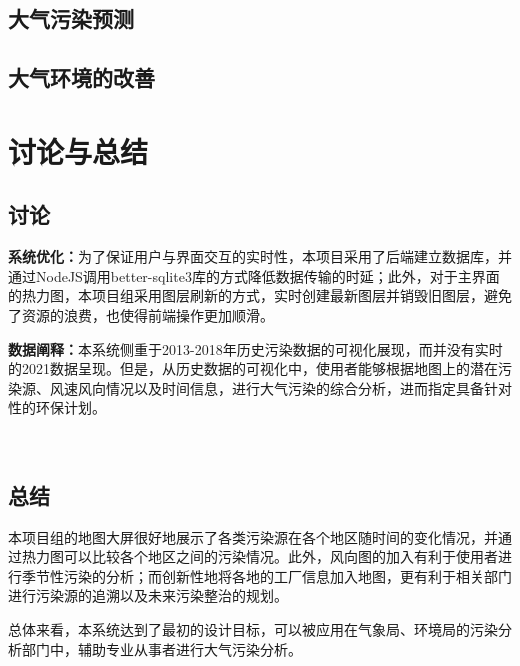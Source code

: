 \documentclass[UTF8]{ctexrep}
\begin{document}
    \subsection{大气污染预测}

    \subsection{大气环境的改善}

    \section{讨论与总结}
    \subsection{讨论}
    \textbf{系统优化：}为了保证用户与界面交互的实时性，本项目采用了后端建立数据库，并通过NodeJS调用better-sqlite3库的方式降低数据传输的时延；此外，对于主界面的热力图，本项目组采用图层刷新的方式，实时创建最新图层并销毁旧图层，避免了资源的浪费，也使得前端操作更加顺滑。
    
    \textbf{数据阐释：}本系统侧重于2013-2018年历史污染数据的可视化展现，而并没有实时的2021数据呈现。但是，从历史数据的可视化中，使用者能够根据地图上的潜在污染源、风速风向情况以及时间信息，进行大气污染的综合分析，进而指定具备针对性的环保计划。
     
    ~\\ 
    \subsection{总结}
    本项目组的地图大屏很好地展示了各类污染源在各个地区随时间的变化情况，并通过热力图可以比较各个地区之间的污染情况。此外，风向图的加入有利于使用者进行季节性污染的分析；而创新性地将各地的工厂信息加入地图，更有利于相关部门进行污染源的追溯以及未来污染整治的规划。
    
    总体来看，本系统达到了最初的设计目标，可以被应用在气象局、环境局的污染分析部门中，辅助专业从事者进行大气污染分析。
\end{document}
